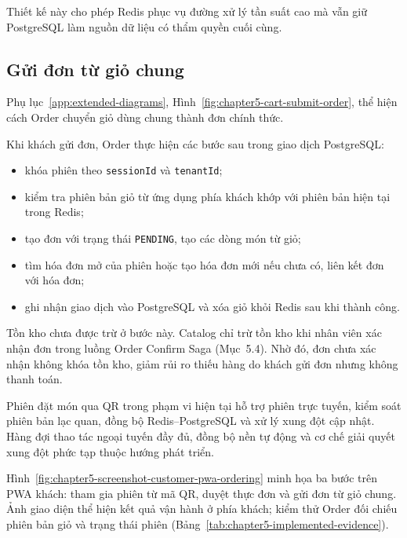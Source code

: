 Thiết kế này cho phép Redis phục vụ đường xử lý tần suất cao mà vẫn giữ PostgreSQL làm nguồn dữ liệu có thẩm quyền cuối cùng.

\subsection{Gửi đơn từ giỏ chung}

Phụ lục~\ref{app:extended-diagrams}, Hình~\ref{fig:chapter5-cart-submit-order}, thể hiện cách Order chuyển giỏ dùng chung thành đơn chính thức.

Khi khách gửi đơn, Order thực hiện các bước sau trong giao dịch PostgreSQL:

\begin{itemize}
  \item khóa phiên theo \texttt{sessionId} và \texttt{tenantId};
  \item kiểm tra phiên bản giỏ từ ứng dụng phía khách khớp với phiên bản hiện tại trong Redis;
  \item tạo đơn với trạng thái \texttt{PENDING}, tạo các dòng món từ giỏ;
  \item tìm hóa đơn mở của phiên hoặc tạo hóa đơn mới nếu chưa có, liên kết đơn với hóa đơn;
  \item ghi nhận giao dịch vào PostgreSQL và xóa giỏ khỏi Redis sau khi thành công.
\end{itemize}

Tồn kho chưa được trừ ở bước này. Catalog chỉ trừ tồn kho khi nhân viên xác nhận đơn trong luồng Order Confirm Saga (Mục~5.4). Nhờ đó, đơn chưa xác nhận không khóa tồn kho, giảm rủi ro thiếu hàng do khách gửi đơn nhưng không thanh toán.

Phiên đặt món qua QR trong phạm vi hiện tại hỗ trợ phiên trực tuyến, kiểm soát phiên bản lạc quan, đồng bộ Redis--PostgreSQL và xử lý xung đột cập nhật. Hàng đợi thao tác ngoại tuyến đầy đủ, đồng bộ nền tự động và cơ chế giải quyết xung đột phức tạp thuộc hướng phát triển.

Hình~\ref{fig:chapter5-screenshot-customer-pwa-ordering} minh họa ba bước trên PWA khách: tham gia phiên từ mã QR, duyệt thực đơn và gửi đơn từ giỏ chung. Ảnh giao diện thể hiện kết quả vận hành ở phía khách; kiểm thử Order đối chiếu phiên bản giỏ và trạng thái phiên (Bảng~\ref{tab:chapter5-implemented-evidence}).

\clearpage
{}

